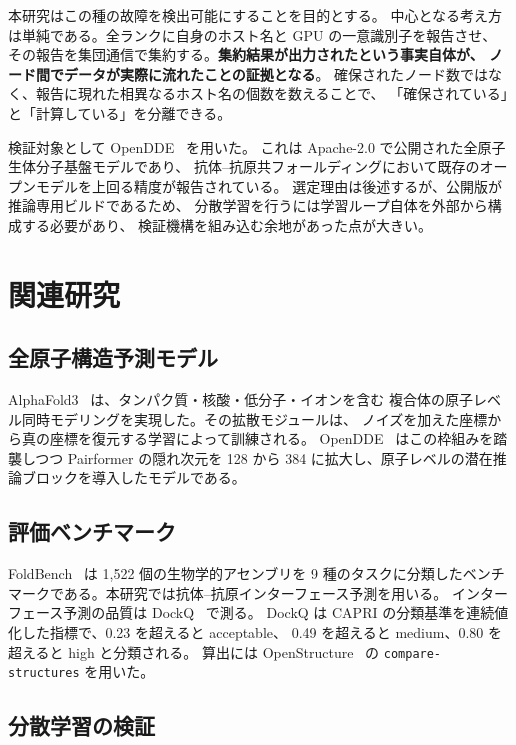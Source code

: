 \documentclass[11pt,a4paper]{article}
\begin{document}
本研究はこの種の故障を検出可能にすることを目的とする。
中心となる考え方は単純である。全ランクに自身のホスト名と GPU の一意識別子を報告させ、
その報告を集団通信で集約する。\textbf{集約結果が出力されたという事実自体が、
ノード間でデータが実際に流れたことの証拠となる}。
確保されたノード数ではなく、報告に現れた相異なるホスト名の個数を数えることで、
「確保されている」と「計算している」を分離できる。

検証対象として OpenDDE~\cite{project-2026-folding} を用いた。
これは Apache-2.0 で公開された全原子生体分子基盤モデルであり、
抗体--抗原共フォールディングにおいて既存のオープンモデルを上回る精度が報告されている。
選定理由は後述するが、公開版が推論専用ビルドであるため、
分散学習を行うには学習ループ自体を外部から構成する必要があり、
検証機構を組み込む余地があった点が大きい。

\section{関連研究}

\subsection{全原子構造予測モデル}

AlphaFold3~\cite{abramson-2024-accurate} は、タンパク質・核酸・低分子・イオンを含む
複合体の原子レベル同時モデリングを実現した。その拡散モジュールは、
ノイズを加えた座標から真の座標を復元する学習によって訓練される。
OpenDDE~\cite{project-2026-folding} はこの枠組みを踏襲しつつ Pairformer の隠れ次元を
128 から 384 に拡大し、原子レベルの潜在推論ブロックを導入したモデルである。

\subsection{評価ベンチマーク}

FoldBench~\cite{xu-2025-benchmarking} は 1,522 個の生物学的アセンブリを
9 種のタスクに分類したベンチマークである。本研究では抗体--抗原インターフェース予測を用いる。
インターフェース予測の品質は DockQ~\cite{basu-2016-dockq} で測る。
DockQ は CAPRI の分類基準を連続値化した指標で、0.23 を超えると acceptable、
0.49 を超えると medium、0.80 を超えると high と分類される。
算出には OpenStructure~\cite{studer-2020-modeling} の
\texttt{compare-structures} を用いた。

\subsection{分散学習の検証}
\end{document}
